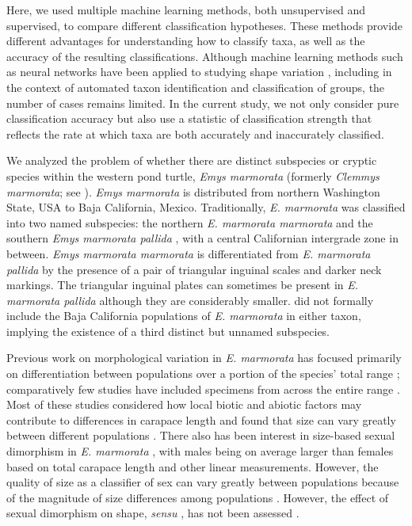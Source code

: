 \documentclass[12pt,letterpaper]{article}
\begin{document}
Here, we used multiple machine learning methods, both unsupervised and supervised, to compare different classification hypotheses. These methods provide different advantages for understanding how to classify taxa, as well as the accuracy of the resulting classifications. Although machine learning methods such as neural networks have been applied to studying shape variation \citep{Baylac2003,Dobigny2003,MacLeod2007,VandenBrink2011}, including in the context of automated taxon identification and classification of groups, the number of cases remains limited. In the current study, we not only consider pure classification accuracy but also use a statistic of classification strength that reflects the rate at which taxa are both accurately and inaccurately classified. 


We analyzed the problem of whether there are distinct subspecies or cryptic species within the western pond turtle, \textit{Emys marmorata} \citep{Baird1852} (formerly \emph{Clemmys marmorata}; see \citealp{Feldman2002}). \textit{Emys marmorata} is distributed from northern Washington State, USA to Baja California, Mexico. Traditionally, \textit{E. marmorata} was classified into two named subspecies: the northern \textit{E. marmorata marmorata} and the southern \textit{Emys marmorata pallida} \citep{Seeliger1945}, with a central Californian intergrade zone in between. \textit{Emys marmorata marmorata} is differentiated from \textit{E. marmorata pallida} by the presence of a pair of triangular inguinal scales and darker neck markings. The triangular inguinal plates can sometimes be present in \textit{E. marmorata pallida} although they are considerably smaller. \citet{Seeliger1945} did not formally include the Baja California populations of \textit{E. marmorata} in either taxon, implying the existence of a third distinct but unnamed subspecies.

Previous work on morphological variation in \textit{E. marmorata} has focused primarily on differentiation between populations over a portion of the species' total range \citep{Lubcke2007,Germano2008,Germano2009,Bury2010}; comparatively few studies have included specimens from across the entire range \citep{Holland1992}. Most of these studies considered how local biotic and abiotic factors may contribute to differences in carapace length and found that size can vary greatly between different populations \citep{Lubcke2007,Germano2008,Germano2009}. There also has been interest in size-based sexual dimorphism in \textit{E. marmorata} \citep{Holland1992,Lubcke2007,Germano2009}, with males being on average larger than females based on total carapace length and other linear measurements. However, the quality of size as a classifier of sex can vary greatly between populations \citep{Holland1992} because of the magnitude of size differences among populations \citep{Lubcke2007,Germano2009}. However, the effect of sexual dimorphism on shape, \textit{sensu} \citet{Kendall1977a}, has not been assessed \citep{Holland1992,Lubcke2007,Germano2008}.
\end{document}
